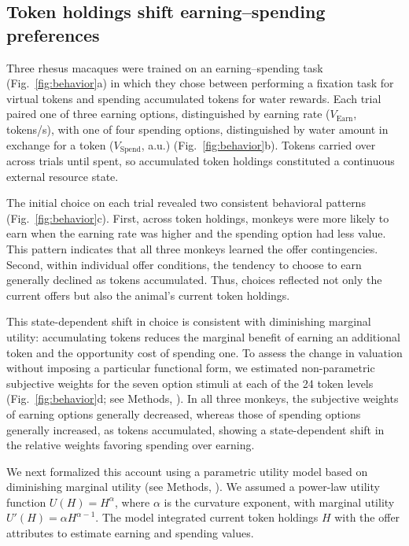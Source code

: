 \documentclass[pdflatex,sn-mathphys-num]{sn-jnl}%
\begin{document}
\subsection{Token holdings shift earning--spending preferences}

Three rhesus macaques were trained on an earning--spending task (Fig.~\ref{fig:behavior}a) in which they chose between performing a fixation task for virtual tokens and spending accumulated tokens for water rewards. Each trial paired one of three earning options, distinguished by earning rate ($V_\text{Earn}$, tokens/s), with one of four spending options, distinguished by water amount in exchange for a token ($V_\text{Spend}$, a.u.) (Fig.~\ref{fig:behavior}b). Tokens carried over across trials until spent, so accumulated token holdings constituted a continuous external resource state.

The initial choice on each trial revealed two consistent behavioral patterns (Fig.~\ref{fig:behavior}c). First, across token holdings, monkeys were more likely to earn when the earning rate was higher and the spending option had less value. This pattern indicates that all three monkeys learned the offer contingencies. Second, within individual offer conditions, the tendency to choose to earn generally declined as tokens accumulated. Thus, choices reflected not only the current offers but also the animal's current token holdings.

This state-dependent shift in choice is consistent with diminishing marginal utility: accumulating tokens reduces the marginal benefit of earning an additional token and the opportunity cost of spending one. To assess the change in valuation without imposing a particular functional form, we estimated non-parametric subjective weights for the seven option stimuli at each of the 24 token levels (Fig.~\ref{fig:behavior}d; see Methods, ). In all three monkeys, the subjective weights of earning options generally decreased, whereas those of spending options generally increased, as tokens accumulated, showing a state-dependent shift in the relative weights favoring spending over earning.

We next formalized this account using a parametric utility model based on diminishing marginal utility (see Methods, ). We assumed a power-law utility function $U(H) = H^\alpha$, where $\alpha$ is the curvature exponent, with marginal utility $U'(H)=\alpha H^{\alpha-1}$. The model integrated current token holdings $H$ with the offer attributes to estimate earning and spending values.
\end{document}

